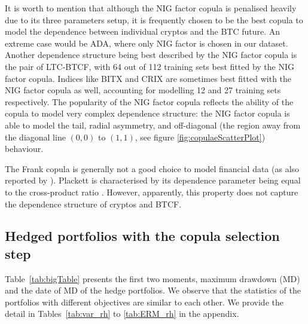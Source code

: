It is worth to mention that although the NIG factor copula is penalised heavily due to its three parameters setup,
it is frequently chosen to be the best copula to model the dependence
between individual cryptos and the BTC future.
An extreme case would be ADA, where only NIG factor is chosen in our dataset.
Another dependence structure being best described by the NIG factor
copula is the pair of LTC-BTCF, with
64 out of 112 training sets best fitted by the NIG factor copula.
Indices like BITX and CRIX are sometimes best fitted with the NIG
factor copula as well, accounting for modelling 12 and 27 training
sets respectively.
The popularity of the NIG factor copula reflects the ability of the copula to
model very complex dependence structure: the
NIG factor copula is able to model the tail, radial asymmetry, and
off-diagonal (the region away from the diagonal line $(0,0)$ to
$(1,1)$, see figure \ref{fig:copulaeScatterPlot}) behaviour. 
  


The Frank copula is generally not a good choice to model financial
data (as also reported by \cite{barbi2014copula}).
Plackett is characterised by its dependence parameter being equal to
the cross-product ratio %
. 
However, apparently, this property does not capture the dependence
structure of cryptos and BTCF.


\subsection{Hedged portfolios with the copula selection step}\label{subsec:HP2}
%    
\begin{landscape}
  
  \end{landscape}
Table~\ref{tab:bigTable} presents the first two moments, maximum drawdown (MD) and the date of MD of the hedge portfolios.
We observe that the statistics of the portfolios with different objectives are similar to each other.
We provide the detail in Tables~\ref{tab:var_rh} to \ref{tab:ERM_rh} in the appendix.

